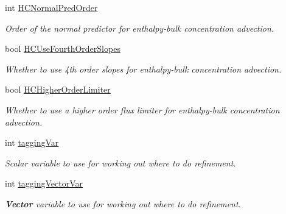 \begin{DoxyCompactItemize}
\mbox{\label{struct_mushy_layer_options_a12d5d7a2dc10359874712678ab27f598}} 
int \hyperlink{struct_mushy_layer_options_a12d5d7a2dc10359874712678ab27f598}{H\+C\+Normal\+Pred\+Order}
\begin{DoxyCompactList}\small\item\em Order of the normal predictor for enthalpy-\/bulk concentration advection. \end{DoxyCompactList}\item 
\mbox{\label{struct_mushy_layer_options_af3886f2b0b18cba16e716caa164093bc}} 
bool \hyperlink{struct_mushy_layer_options_af3886f2b0b18cba16e716caa164093bc}{H\+C\+Use\+Fourth\+Order\+Slopes}
\begin{DoxyCompactList}\small\item\em Whether to use 4th order slopes for enthalpy-\/bulk concentration advection. \end{DoxyCompactList}\item 
\mbox{\label{struct_mushy_layer_options_a1bb12736d03f03198672fabbdff9d4b0}} 
bool \hyperlink{struct_mushy_layer_options_a1bb12736d03f03198672fabbdff9d4b0}{H\+C\+Higher\+Order\+Limiter}
\begin{DoxyCompactList}\small\item\em Whether to use a higher order flux limiter for enthalpy-\/bulk concentration advection. \end{DoxyCompactList}\item 
\mbox{\label{struct_mushy_layer_options_a12dccfa9a858bed0dabcc73ca7c7046d}} 
int \hyperlink{struct_mushy_layer_options_a12dccfa9a858bed0dabcc73ca7c7046d}{tagging\+Var}
\begin{DoxyCompactList}\small\item\em Scalar variable to use for working out where to do refinement. \end{DoxyCompactList}\item 
\mbox{\label{struct_mushy_layer_options_ad9c050dd4acf197a67d7b77b1d0fbd7d}} 
int \hyperlink{struct_mushy_layer_options_ad9c050dd4acf197a67d7b77b1d0fbd7d}{tagging\+Vector\+Var}
\begin{DoxyCompactList}\small\item\em \textbf{ Vector} variable to use for working out where to do refinement. \end{DoxyCompactList}\item 

\end{DoxyCompactItemize}
